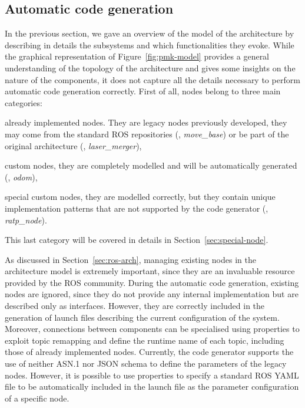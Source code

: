 \subsection{Automatic code generation}
In the previous section, we gave an overview of the model of the architecture by describing in details the subsystems and which functionalities they evoke. While the graphical representation of Figure~\ref{fig:pmk-model} provides a general understanding of the topology of the architecture and gives some insights on the nature of the components, it does not capture all the details necessary to perform automatic code generation correctly. First of all, nodes belong to three main categories:
\begin{enumerate*}[label=(\roman*)]
\item already implemented nodes. They are legacy nodes previously developed, they may come from the standard ROS repositories (\eg, \textit{move\_base}) or be part of the original architecture (\eg, \textit{laser\_merger}), 
\item custom nodes, they are completely modelled and will be automatically generated (\eg, \textit{odom}), 
\item special custom nodes, they are modelled correctly, but they contain unique implementation patterns that are not supported by the code generator (\eg, \textit{ratp\_node}).
\end{enumerate*} This last category will be covered in details in Section~\ref{sec:special-node}. 

As discussed in Section~\ref{sec:ros-arch}, managing existing nodes in the architecture model is extremely important, since they are an invaluable resource provided by the ROS community. During the automatic code generation, existing nodes are ignored, since they do not provide any internal implementation but are described only as interfaces. However, they are correctly included in the generation of launch files describing the current configuration of the system. Moreover, connections between components can be specialised using properties to exploit topic remapping and define the runtime name of each topic, including those of already implemented nodes. Currently, the code generator supports the use of neither ASN.1 nor JSON schema to define the parameters of the legacy nodes. However,  it is possible to use properties to specify a standard ROS YAML file to be automatically included in the launch file as the parameter configuration of a specific node.

